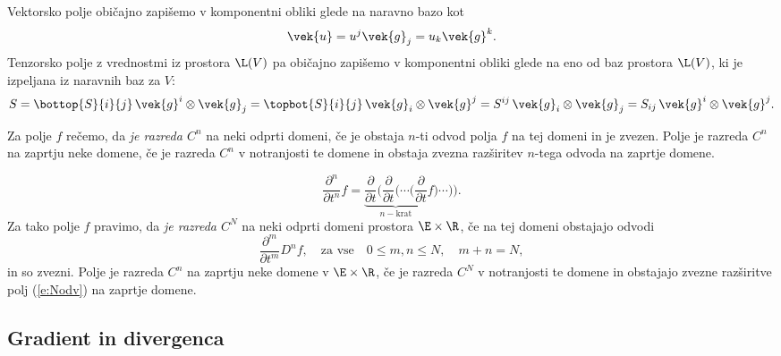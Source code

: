 Vektorsko polje običajno zapišemo v komponentni obliki glede na naravno bazo kot
\[ \vek{u}=u^j\vek{g}_j=u_k\vek{g}^k. \]
Tenzorsko polje z vrednostmi iz prostora $\L(V)$ pa običajno zapišemo v komponentni obliki
glede na eno od baz prostora $\L(V)$, ki je izpeljana iz naravnih baz za $V$:
\[
	S=\bottop{S}{i}{j}\,\vek{g}^i\otimes\vek{g}_j=\topbot{S}{i}{j}\,\vek{g}_i\otimes\vek{g}^j=
	S^{ij}\,\vek{g}_i\otimes\vek{g}_j=S_{ij}\,\vek{g}^i\otimes\vek{g}^j.
\]

Za polje $f$ rečemo, da \emph{je razreda $C^n$} na neki odprti domeni, če je obstaja $n$-ti odvod polja $f$
na tej domeni in je zvezen.
Polje je razreda $C^n$ na zaprtju neke domene, če je razreda $C^n$ v notranjosti te domene in obstaja zvezna razširitev
$n$-tega odvoda na zaprtje domene.

\[
	\frac{\partial^n}{\partial t^n}f = \underbrace{\frac{\partial}{\partial t}
	\bigg(\frac{\partial}{\partial t}\bigg(\cdots \bigg(\frac{\partial}{\partial t}}_{n-\mathrm{krat}}f\bigg)\cdots\bigg)\bigg).
\]
Za tako polje $f$ pravimo, da \emph{je razreda $C^N$} na neki odprti domeni prostora $\E\times\R$, če na tej domeni obstajajo odvodi
\begin{equation}\label{e:Nodv}
	\frac{\partial^m}{\partial t^m}D^n f,\quad \textrm{za vse}\quad 0\leq m,n\leq N,\quad m+n=N,
\end{equation}
in so zvezni. Polje je razreda $C^n$ na zaprtju neke domene v $\E\times\R$, če je razreda $C^N$
v notranjosti te domene in obstajajo zvezne razširitve polj (\ref{e:Nodv}) na zaprtje domene.

\subsection{Gradient in divergenca}

